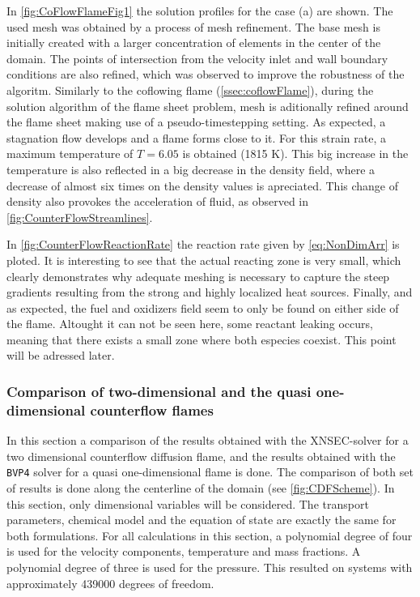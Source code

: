 In \cref{fig:CoFlowFlameFig1} the solution profiles for the case (a) are shown. The used mesh was obtained by a process of mesh refinement. The base mesh is initially created with a larger concentration of elements in the center of the domain. The points of intersection from the velocity inlet and wall boundary conditions are also refined, which was observed to improve the robustness of the algoritm. Similarly to the coflowing flame (\cref{ssec:coflowFlame}), during the solution algorithm of the flame sheet problem, mesh is aditionally refined around the flame sheet making use of a pseudo-timestepping setting.
As expected, a stagnation flow develops and a flame forms close to it. For this strain rate, a maximum temperature of $T = 6.05$ is obtained (1815 $\si{\kelvin}$). This big increase in the temperature is also reflected in a big decrease in the density field, where a decrease of almost six times on the density values is apreciated. This change of density also provokes the acceleration of fluid, as observed in \cref{fig:CounterFlowStreamlines}. 

In \cref{fig:CounterFlowReactionRate} the reaction rate given by \cref{eq:NonDimArr} is ploted. It is interesting to see that the actual reacting zone is very small, which clearly demonstrates why adequate meshing is necessary to capture the steep gradients resulting from the strong and highly localized heat sources. Finally, and as expected, the fuel and oxidizers field seem to only be found on either side of the flame. Altought it can not be seen here, some reactant leaking occurs, meaning that there exists a small zone where both especies coexist. This point will be adressed later. 


\subsubsection{Comparison of two-dimensional and the quasi one-dimensional counterflow flames}
In this section a comparison of the results obtained with the XNSEC-solver for a two dimensional counterflow diffusion flame, and the results obtained with the \lstinline|BVP4| solver for a quasi one-dimensional flame is done. The comparison of both set of results is done along the centerline of the domain (see \cref{fig:CDFScheme}). In this section, only dimensional variables will be considered. The transport parameters, chemical model and the equation of state are exactly the same for both formulations. For all calculations in this section, a polynomial degree of four is used for the velocity components, temperature and mass fractions. A polynomial degree of three is used for the pressure. This resulted on systems with approximately 439000 degrees of freedom. 
 
